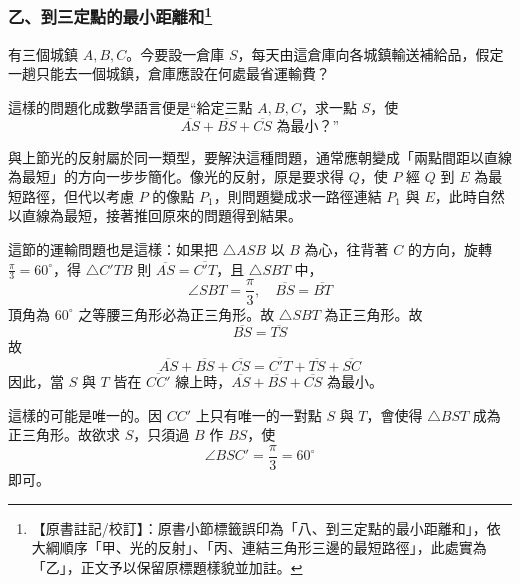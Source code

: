 \subsubsection*{乙、到三定點的最小距離和\label{note:b3s-ch5-p251-sec-title}\footnote{【原書註記/校訂】：原書小節標籤誤印為「八、到三定點的最小距離和」，依大綱順序「甲、光的反射」、「丙、連結三角形三邊的最短路徑」，此處實為「乙」，正文予以保留原標題樣貌並加註。}}

\begin{example}[論例 7]
有三個城鎮 $A, B, C$。今要設一倉庫 $S$，每天由這倉庫向各城鎮輸送補給品，假定一趟只能去一個城鎮，倉庫應設在何處最省運輸費？
\end{example}

這樣的問題化成數學語言便是“給定三點 $A, B, C$，求一點 $S$，使
\[ \overline{AS} + \overline{BS} + \overline{CS} \text{ 為最小？”} \]

與上節光的反射屬於同一類型，要解決這種問題，通常應朝變成「兩點間距以直線為最短」的方向一步步簡化。像光的反射，原是要求得 $Q$，使 $P$ 經 $Q$ 到 $E$ 為最短路徑，但代以考慮 $P$ 的像點 $P_1$，則問題變成求一路徑連結 $P_1$ 與 $E$，此時自然以直線為最短，接著推回原來的問題得到結果。

這節的運輸問題也是這樣：如果把 $\triangle ASB$ 以 $B$ 為心，往背著 $C$ 的方向，旋轉 $\frac{\pi}{3} = 60^\circ$，得 $\triangle C'TB$ 則 $\overline{AS} = \overline{C'T}$，且 $\triangle SBT$ 中，
\[ \angle SBT = \frac{\pi}{3},\quad \overline{BS} = \overline{BT} \]
頂角為 $60^\circ$ 之等腰三角形必為正三角形。故 $\triangle SBT$ 為正三角形。故
\[ \overline{BS} = \overline{TS} \]
故
\[ \overline{AS} + \overline{BS} + \overline{CS} = \overline{C'T} + \overline{TS} + \overline{SC} \]
因此，當 $S$ 與 $T$ 皆在 $\overline{CC'}$ 線上時，$\overline{AS} + \overline{BS} + \overline{CS}$ 為最小。

這樣的可能是唯一的。因 $CC'$ 上只有唯一的一對點 $S$ 與 $T$，會使得 $\triangle BST$ 成為正三角形。故欲求 $S$，只須過 $B$ 作 $BS$，使
\[ \angle BSC' = \frac{\pi}{3} = 60^\circ \]
即可。


